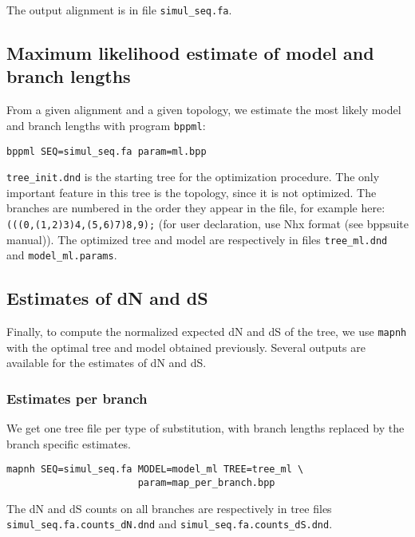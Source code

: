 \documentclass[11pt, a4paper]{article}
\begin{document}
{The output alignment is in file \texttt{simul\_seq.fa}.


\subsection*{Maximum likelihood estimate of model and branch lengths}

From a given alignment and a given topology, we estimate the most
likely model and branch lengths with program \texttt{bppml}:

\begin{verbatim}
bppml SEQ=simul_seq.fa param=ml.bpp
\end{verbatim}

\texttt{tree\_init.dnd} is the starting tree for the optimization
procedure. The only important feature in this tree is the topology,
since it is not optimized. The branches are numbered in the order they
appear in the file, for example here:
\texttt{(((0,(1,2)3)4,(5,6)7)8,9);} (for user declaration, use Nhx
format (see bppsuite manual)). The optimized tree and model are
respectively in files \texttt{tree\_ml.dnd} and
\texttt{model\_ml.params}.

\subsection*{Estimates of dN and dS}

Finally, to compute the normalized expected dN and dS of the tree, we
use \texttt{mapnh} with the optimal tree and model obtained
previously. Several outputs are available for the estimates of dN and
dS.

\subsubsection*{Estimates per branch}

We get one tree file per type of substitution, with branch lengths
replaced by the branch specific estimates.

\begin{verbatim}
mapnh SEQ=simul_seq.fa MODEL=model_ml TREE=tree_ml \
                       param=map_per_branch.bpp
\end{verbatim}

The dN and dS counts on all branches are respectively in tree files
\\ 
\verb|simul_seq.fa.counts_dN.dnd| and
\verb|simul_seq.fa.counts_dS.dnd|.

\smallskip

}
\end{document}

